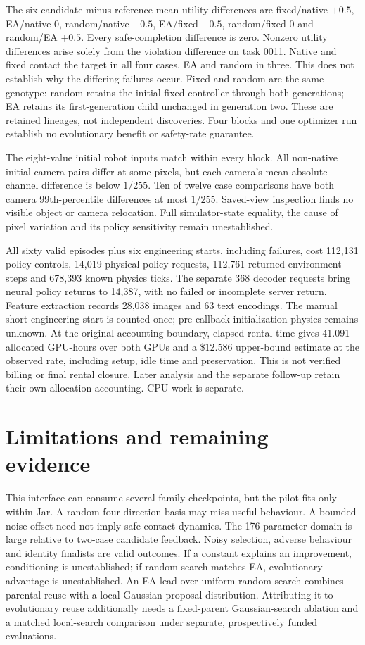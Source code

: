 \documentclass[sigconf,dvipsnames,balance=false]{acmart}
\begin{document}
The six candidate-minus-reference mean utility differences are fixed/native
$+0.5$, EA/native $0$, random/native $+0.5$, EA/fixed $-0.5$, random/fixed $0$
and random/EA $+0.5$. Every safe-completion difference is zero. Nonzero utility
differences arise solely from the violation difference on task 0011. Native and
fixed contact the target in all four cases, EA and random in three. This does
not establish why the differing failures occur. Fixed and random are the same
genotype: random retains the initial fixed controller through both generations;
EA retains its first-generation child unchanged in generation two. These are
retained lineages, not independent discoveries. Four blocks and one optimizer
run establish no evolutionary benefit or safety-rate guarantee.

The eight-value initial robot inputs match within every block. All non-native
initial camera pairs differ at some pixels, but each camera's mean absolute
channel difference is below $1/255$. Ten of twelve case comparisons have both
camera 99th-percentile differences at most $1/255$. Saved-view inspection finds
no visible object or camera relocation. Full simulator-state equality, the
cause of pixel variation and its policy sensitivity remain unestablished.

All sixty valid episodes plus six engineering starts, including failures,
cost 112,131 policy controls, 14,019 physical-policy requests, 112,761 returned
environment steps and 678,393 known physics ticks. The separate 368 decoder
requests bring neural policy returns to 14,387, with no failed or incomplete
server return. Feature extraction records 28,038 images and 63 text encodings.
The manual short engineering start is counted once; pre-callback initialization
physics remains unknown. At the original accounting boundary, elapsed rental
time gives 41.091 allocated GPU-hours over both GPUs and a \$12.586 upper-bound
estimate at the observed rate, including setup, idle time and preservation.
This is not verified billing or final rental closure. Later analysis and the
separate follow-up retain their own allocation accounting. CPU work is separate.



\section{Limitations and remaining evidence}
This interface can consume several family checkpoints, but the pilot fits only
within Jar. A random four-direction basis may miss useful behaviour. A bounded
noise offset need not imply safe contact dynamics. The 176-parameter domain is
large relative to two-case candidate feedback. Noisy selection, adverse behaviour
and identity finalists are valid outcomes. If a constant explains an improvement,
conditioning is unestablished; if random search matches EA, evolutionary advantage
is unestablished.
An EA lead over uniform random search combines parental reuse with a local
Gaussian proposal distribution. Attributing it to evolutionary reuse additionally
needs a fixed-parent Gaussian-search ablation and a matched local-search comparison
under separate, prospectively funded evaluations.
\end{document}
